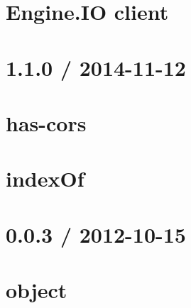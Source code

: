 \documentclass[twoside]{book}
\newcommand{\+}{\discretionary{\mbox{\scriptsize$\hookleftarrow$}}{}{}}
\begin{document}
\chapter{Engine.\+IO client}
\label{md_bin_node_modules_socket_8io_node_modules_socket_8io-client_node_modules_engine_8io-client__r_e_a_d_m_e}

\chapter{1.1.0 / 2014-\/11-\/12}
\label{md_bin_node_modules_socket_8io_node_modules_socket_8io-client_node_modules_has-cors__history}

\chapter{has-\/cors}
\label{md_bin_node_modules_socket_8io_node_modules_socket_8io-client_node_modules_has-cors__readme}

\chapter{index\+Of}
\label{md_bin_node_modules_socket_8io_node_modules_socket_8io-client_node_modules_indexof__readme}

\chapter{0.0.3 / 2012-\/10-\/15}
\label{md_bin_node_modules_socket_8io_node_modules_socket_8io-client_node_modules_object-component__history}

\chapter{object}
\label{md_bin_node_modules_socket_8io_node_modules_socket_8io-client_node_modules_object-component__readme}

\end{document}
